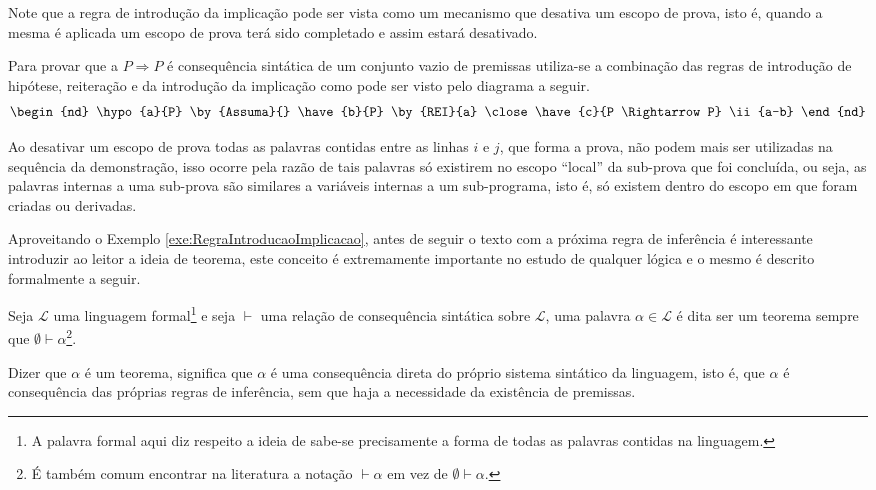 Note que a regra de introdução da implicação pode ser vista como um mecanismo que desativa um escopo de prova, isto é, quando a mesma é aplicada um escopo de prova terá sido completado e assim estará desativado.

\begin{exemplo}\label{exe:RegraIntroducaoImplicacao}
  Para provar que a $P \Rightarrow P$ é consequência sintática de um conjunto vazio de premissas utiliza-se a combinação das regras de introdução de hipótese, reiteração e da introdução da implicação como pode ser visto pelo diagrama a seguir.
  $$
    \begin{nd}
      \hypo{a}{P} \by{Assuma}{}  
      \have{b}{P} \by{REI}{a}
      \close
      \have{c}{P \Rightarrow P} \ii{a-b}
    \end{nd}
  $$
\end{exemplo}

\begin{atencao}
  Ao desativar um escopo de prova todas as palavras contidas entre as linhas $i$ e $j$, que forma a prova, não podem mais ser utilizadas na sequência da demonstração, isso ocorre pela razão de tais palavras só existirem no escopo ``local'' da sub-prova que foi concluída, ou seja, as palavras internas a uma sub-prova são similares a variáveis internas a um sub-programa, isto é, só existem dentro do escopo em que foram criadas ou derivadas.
\end{atencao}

Aproveitando o Exemplo \ref{exe:RegraIntroducaoImplicacao}, antes de seguir o texto com a próxima regra de inferência é interessante introduzir ao leitor a ideia de teorema, este conceito é extremamente importante no estudo de qualquer lógica e o mesmo é descrito formalmente a seguir.

\begin{definicao}[Teorema]
  Seja $\mathcal{L}$ uma linguagem formal\footnote{A palavra formal aqui diz respeito a ideia de sabe-se precisamente a forma de todas as palavras contidas na linguagem.} e seja $\vdash$ uma relação de consequência sintática sobre $\mathcal{L}$, uma palavra $\alpha \in \mathcal{L}$ é dita ser um teorema sempre que $\emptyset \vdash \alpha$\footnote{É também comum encontrar na literatura a notação $\vdash \alpha$ em vez de $\emptyset \vdash \alpha$.}.
\end{definicao}

\begin{atencao}
  Dizer que $\alpha$ é um teorema, significa que $\alpha$ é uma consequência direta do próprio sistema sintático da linguagem, isto é, que $\alpha$ é consequência das próprias regras de inferência, sem que haja a necessidade da existência de premissas. 
\end{atencao}

